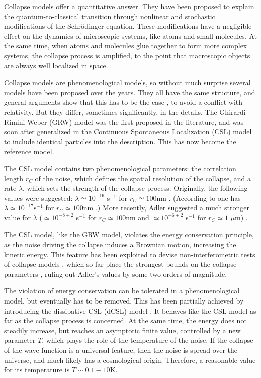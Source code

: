 \documentclass[prl,twocolumn,showpacs,superscriptaddress,groupedaddress]{revtex4}
\begin{document}
Collapse models \cite{collapse_review1,collapse_review2} offer a quantitative answer. They have been proposed to explain the quantum-to-classical transition through nonlinear and stochastic modifications of the Schr\"odinger equation. These modifications have a negligible effect on the dynamics of microscopic systems, like atoms and small molecules. At the same time, when atoms and molecules glue together to form more complex systems, the collapse process is amplified, to the point that macroscopic objects are always well localized in space.  

Collapse models are phenomenological models, so without much surprise several models have been proposed over the years. They all have the same structure, and  general arguments show that this has to be the case \cite{trace}, to avoid a conflict with relativity. But they differ, sometimes significantly, in the details. The Ghirardi-Rimini-Weber (GRW) model \cite{GRW} was the first proposed in the literature, and was soon after generalized in the Continuous Spontaneous Localization (CSL) model \cite{CSL1,CSL2} to include identical particles into the description. This has now become the reference model. 

The CSL model contains two phenomenological parameters: the correlation length $r_C$ of the noise, which defines the spatial resolution of the collapse, and a  rate $\lambda$, which sets the strength of the collapse process. Originally, the following values were suggested:  $\lambda \simeq 10^{-16}$ s$^{-1}$ for $r_C \simeq 100\text{nm}$ \cite{GRW}. (According to \cite{CSL1,CSL2}  one has $\lambda \simeq 10^{-17}\text{s}^{-1}$ for  $r_C \simeq 100\text{nm}$ .) More recently, Adler suggested a much stronger value for $\lambda$ ($\simeq 10^{-8\pm2}$ s$^{-1}$ for $r_C \simeq 100\text{nm}$  and $\simeq 10^{-6\pm2}$ s$^{-1}$ for $r_C \simeq 1$ $\mu\text{m}$) \cite{1751-8121-40-12-S03}.

The CSL model, like the GRW model, violates the energy conservation principle, as the noise driving the collapse induces a Brownian motion, increasing the kinetic energy. This feature has been exploited to devise non-interferometric tests of collapse models \cite{PhysRevLett.112.210404,PhysRevA.89.032127,PhysRevLett.113.020405,PhysRevLett.114.050403}, which so far  place the strongest bounds on the collapse parameters \cite{2015arXiv151005791V,Curceanu}, ruling out Adler's values by some two orders of magnitude.

The violation of  energy conservation  can be tolerated in a phenomenological model, but eventually has to be removed. This has been partially achieved by introducing the dissipative CSL (dCSL) model \cite{Smirne:2014paa}. It behaves like the CSL model as far as the collapse process is concerned. At the same time, the energy does not steadily increase, but reaches an asymptotic finite value, controlled by a new parameter $T$, which plays the role of the temperature of the noise. If the collapse of the wave function is a universal feature, then the noise is spread over the universe, and much likely has a cosmological origin. Therefore, a reasonable value for its temperature is $T \sim 0.1-10 $K.
\end{document}
